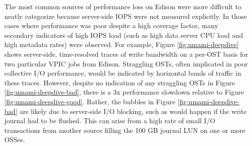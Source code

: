The most common sources of performance loss on Edison were more difficult to neatly categorize because server-side IOPS were not measured explicitly.
In those cases where performance was poor despite a high coverage factor, many secondary indicators of high IOPS load (such as high data server CPU load and high metadata rates) were observed.
For example, Figure \ref{fig:umami-deepdive} shows server-side, time-resolved traces of write bandwidth on a per-OST basis for two particular VPIC jobs from Edison.
Straggling OSTs, often implicated in poor collective I/O performance, would be indicated by horizontal bands of traffic in these traces.
However, despite no indication of any straggling OSTs in Figure \ref{fig:umami-deepdive-bad}, there is a 3x performance slowdown relative to Figure \ref{fig:umami-deepdive-good}.
Rather, the bubbles in Figure \ref{fig:umami-deepdive-bad} are likely due to server-side I/O blocking, such as would happen if the write journal had to be flushed.  
This can arise from a high rate of small I/O transactions from another source filling the 100 GB journal LUN on one or more OSSes.

